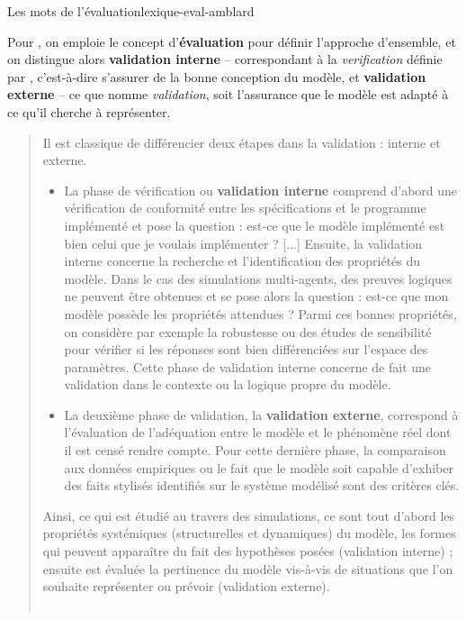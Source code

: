 \clearpage
\begin{encadre}{Les mots de l'évaluation}{lexique-eval-amblard}

Pour \textcite{amblard_evaluation_2006}, on emploie le concept d'\textbf{évaluation} pour définir l'approche d'ensemble, et on distingue alors \og \textbf{validation interne}\fg{} -- correspondant à la \textit{verification} définie par \textcite{balci_validation_1994}, c'est-à-dire s'assurer de la bonne conception du modèle, et \og \textbf{validation externe}\fg{} -- ce que \citeauthor{balci_validation_1994} nomme \textit{validation}, soit l'assurance que le modèle est adapté à ce qu'il cherche à représenter.

\begin{quotation}
\noindent \og Il est classique de différencier deux étapes dans la validation : interne et externe.
\begin{itemize}
	\item La phase de vérification ou \textbf{validation interne} comprend d'abord une vérification de conformité entre les spécifications et le programme implémenté et pose la question : est-ce que le modèle implémenté est bien celui que je voulais implémenter ? [...]
	Ensuite, la validation interne concerne la recherche et l'identification des propriétés du modèle.
	Dans le cas des simulations multi-agents, des preuves logiques ne peuvent être obtenues et se pose alors la question : est-ce que mon modèle possède les propriétés attendues ?
	Parmi ces bonnes propriétés, on considère par exemple la robustesse ou des études de sensibilité pour vérifier si les réponses sont bien différenciées sur l'espace des paramètres.
	Cette phase de validation interne concerne de fait une validation dans le contexte ou la logique propre du modèle.

	\item La deuxième phase de validation, la \textbf{validation externe}, correspond à l’évaluation de l’adéquation entre le modèle et le phénomène réel dont il est censé rendre compte.
	Pour cette dernière phase, la comparaison aux données empiriques ou le fait que le modèle soit capable d'exhiber des faits stylisés identifiés sur le système modélisé sont des critères clés.
\end{itemize}
Ainsi, ce qui est étudié au travers des simulations, ce sont tout d’abord les propriétés systémiques (structurelles et dynamiques) du modèle, les formes qui peuvent apparaître du fait des hypothèses posées (validation interne) ; ensuite est évaluée la pertinence du modèle vis-à-vis de situations que l’on souhaite représenter ou prévoir (validation externe).\fg{}\\
	\mbox{}~ \hfill \cite[110-111]{amblard_evaluation_2006}
\end{quotation}

\end{encadre}

